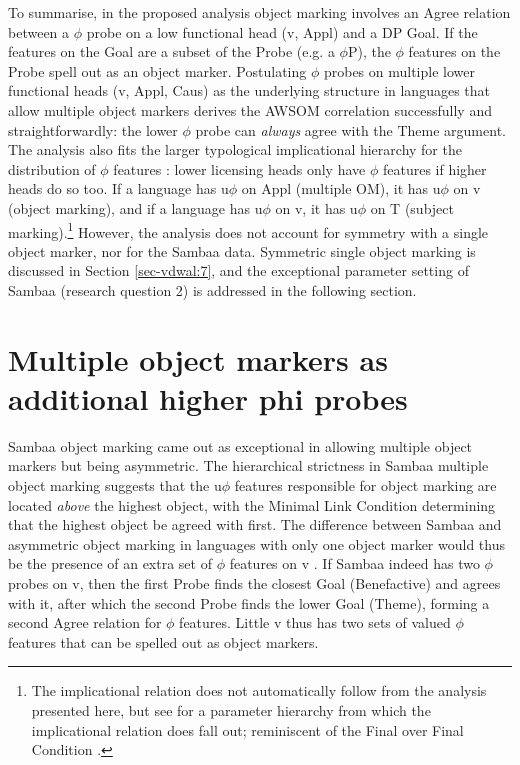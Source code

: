\documentclass[output=paper
,modfonts
,nonflat]{langsci/langscibook}
\begin{document}
To summarise, in the proposed analysis object marking involves an Agree relation between a $\phi$ probe on a low functional head (v, Appl) and a DP Goal. If the features on the Goal are a subset of the Probe (e.g. a $\phi$P), the $\phi$ features on the Probe spell out as an object marker. Postulating $\phi$ probes on multiple lower functional heads (v, Appl, Caus) as the underlying structure in languages that allow multiple object markers derives the AWSOM correlation successfully and straightforwardly: the lower $\phi$ probe can \textit{always} agree with the Theme argument. The analysis also fits the larger typological implicational hierarchy for the distribution of $\phi$ features \citep{Moravcsik1974, Givon1976}: lower licensing heads only have $\phi$ features if higher heads do so too. If a language has u$\phi$ on Appl (multiple OM), it has u$\phi$ on v (object marking), and if a language has u$\phi$ on v, it has u$\phi$ on T (subject marking).\footnote{The implicational relation does not automatically follow from the analysis presented here, but see \citet{Van_der_WalTA} for a parameter hierarchy from which the implicational relation does fall out; reminiscent of the Final over Final Condition \citep{Sheehan_et_al2017}.} However, the analysis does not account for symmetry with a single object marker, nor for the Sambaa data. Symmetric single object marking is discussed in Section \ref{sec-vdwal:7}, and the exceptional parameter setting of Sambaa (research question 2) is addressed in the following section. 

\section{Multiple object markers as additional higher phi probes} \label{sec-vdwal:6}

Sambaa object marking came out as exceptional in allowing multiple object markers but being asymmetric. The hierarchical strictness in Sambaa multiple object marking suggests that the u$\phi$ features responsible for object marking are located \textit{above} the highest object, with the Minimal Link Condition determining that the highest object be agreed with first. The difference between Sambaa and asymmetric object marking in languages with only one object marker would thus be the presence of an extra set of $\phi$ features on v \citep{Adams2010}. If Sambaa indeed has two $\phi$ probes on v, then the first Probe finds the closest Goal (Benefactive) and agrees with it, after which the second Probe finds the lower Goal (Theme), forming a second Agree relation for $\phi$ features. Little v thus has two sets of valued $\phi$ features that can be spelled out as object markers.
\end{document}
